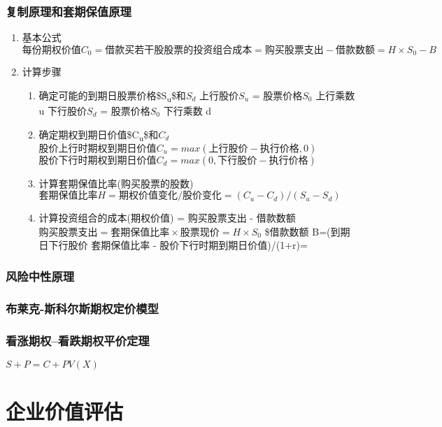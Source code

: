 \documentclass[11pt]{article}
\begin{document}
\subsubsection{复制原理和套期保值原理}
\label{sec:org3d2d05f}
\begin{enumerate}
\item 基本公式
\label{sec:org815284f}
\(每份期权价值 C_{0} = 借款买若干股股票的投资组合成本 = 购买股票支出 - 借款数额 = H \times S_{0} - B\)
\item 计算步骤
\label{sec:org1464b90}
\begin{enumerate}
\item 确定可能的到期日股票价格\$S\textsubscript{u}\$和\(S_{d}\)
上行股价\(S_{u}\) = 股票价格\(S_{0}\) \texttimes{} 上行乘数 u
下行股价\(S_{d}\) = 股票价格\(S_{0}\) \texttimes{} 下行乘数 d
\item 确定期权到期日价值\$C\textsubscript{u}\$和\(C_{d}\)
\(股价上行时期权到期日价值 C_{u}=max(上行股价-执行价格,0)\)
\(股价下行时期权到期日价值 C_{d} = max(0,下行股价-执行价格)\)
\item 计算套期保值比率(购买股票的股数)
\(套期保值比率 H = 期权价值变化/股价变化 = (C_{u}-C_{d})/(S_{u}-S_{d})\)
\item 计算投资组合的成本(期权价值) = 购买股票支出 - 借款数额
\(购买股票支出 = 套期保值比率 \times 股票现价 = H \times S_{0}\)
\$借款数额 B=(到期日下行股价 \texttimes{} 套期保值比率 -  股价下行时期到期日价值)/(1+r)=\frac{}
\end{enumerate}
\end{enumerate}
\subsubsection{风险中性原理}
\label{sec:org7a0afb2}
\subsubsection{布莱克-斯科尔斯期权定价模型}
\label{sec:orge0eb7f0}
\subsubsection{看涨期权--看跌期权平价定理}
\label{sec:org3712126}
\(S+P=C+PV(X)\)
\section{企业价值评估}
\label{sec:org3fcb61d}
\end{document}

